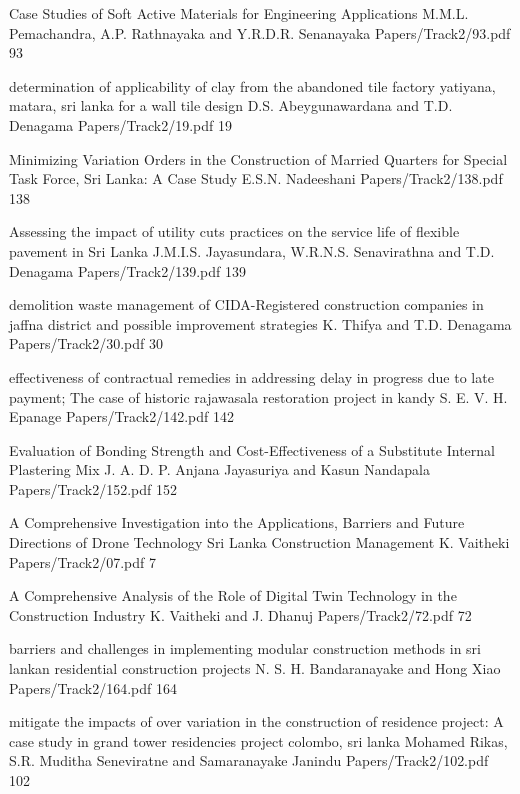    \addpaper
{Case Studies of Soft Active Materials for Engineering Applications}
 {M.M.L. Pemachandra, A.P. Rathnayaka and Y.R.D.R. Senanayaka} 
 {Papers/Track2/93.pdf}
   {93} 

\addpaper
{determination of applicability of clay from the abandoned tile factory yatiyana, matara, sri lanka for a wall tile design}
{D.S. Abeygunawardana and T.D. Denagama}
{Papers/Track2/19.pdf}
{19}



 \addpaper
{Minimizing Variation Orders in the Construction of Married Quarters for Special Task Force, Sri Lanka: A Case Study}
{E.S.N. Nadeeshani}
{Papers/Track2/138.pdf}
{138}


\addpaper
{Assessing the impact of utility cuts practices on the service life of flexible pavement in Sri Lanka}
{J.M.I.S. Jayasundara, W.R.N.S. Senavirathna and T.D. Denagama}
{Papers/Track2/139.pdf}
{139}

\addpaper
{demolition waste management of CIDA-Registered construction companies in jaffna district and possible improvement strategies}
{K. Thifya and T.D. Denagama}
{Papers/Track2/30.pdf}
{30}

   \addpaper
{effectiveness of contractual remedies in addressing delay in progress due to late payment; The case of historic rajawasala restoration project in kandy}
 {S. E. V. H. Epanage} 
 {Papers/Track2/142.pdf}
   {142} 

\addpaper
{Evaluation of Bonding Strength and Cost-Effectiveness of a Substitute Internal Plastering Mix}
{J. A. D. P. Anjana Jayasuriya and Kasun Nandapala}
{Papers/Track2/152.pdf}
{152}


\addpaper
{A Comprehensive Investigation into the Applications, Barriers and Future Directions of Drone Technology Sri Lanka Construction Management}
{K. Vaitheki}
{Papers/Track2/07.pdf}
{7}


\addpaper
{A Comprehensive Analysis of the Role of Digital Twin Technology in the Construction Industry}
{K. Vaitheki and J. Dhanuj}
{Papers/Track2/72.pdf}
{72}



\addpaper
{barriers and challenges in implementing modular construction methods in sri lankan residential construction projects}
{N. S. H. Bandaranayake and Hong Xiao}
{Papers/Track2/164.pdf}
{164}




   \addpaper
{mitigate the impacts of over variation in the
construction of residence project: A case
study in grand tower residencies project
colombo, sri lanka}
 {Mohamed Rikas, S.R. Muditha Seneviratne and Samaranayake Janindu} 
 {Papers/Track2/102.pdf}
   {102} 


